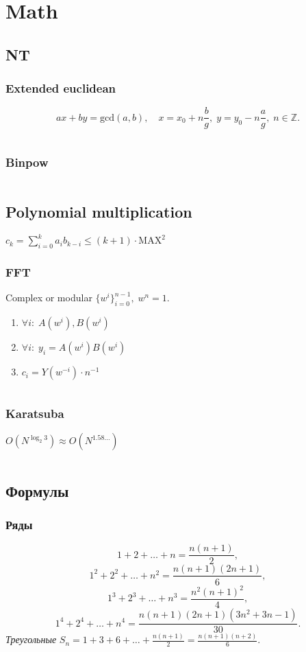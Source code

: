 \section{Math}

\subsection{NT}
\subsubsection{Extended euclidean}
$$ax+by=\text{gcd}(a,b),\quad x=x_0+n\dfrac{b}{g},\;y=y_0-n\dfrac{a}{g},\;n\in\mathbb{Z}.$$
\inputminted{cpp}{../code/math/egcd.cpp}
\subsubsection{Binpow}
\inputminted{cpp}{../code/math/binpow.cpp}

\subsection{Polynomial multiplication}
$c_k=\displaystyle\sum_{i=0}^ka_ib_{k-i}\le(k+1)\cdot\text{MAX}^2$

\subsubsection{FFT}
Complex or modular $\{w^i\}_{i=0}^{n-1},\;w^n=1$.
\begin{enumerate}
\item $\forall i:\;A(w^i),B(w^i)$
\item $\forall i:\;y_i=A(w^i)B(w^i)$
\item $c_i=Y(w^{-i})\cdot n^{-1}$
\end{enumerate}
\inputminted{cpp}{../code/math/fft.cpp}
\subsubsection{Karatsuba}
$O(N^{\log_2 3})\approx O(N^{1.58\dots})$
\inputminted{cpp}{../code/math/karatsuba.cpp}

\subsection{Формулы}
\subsubsection{Ряды}
$$1+2+\dots+n=\frac{n(n+1)}{2},$$
$$1^2+2^2+\dots+n^2=\frac{n(n+1)(2n+1)}{6},$$
$$1^3+2^3+\dots+n^3=\frac{n^2(n+1)^2}{4},$$
$$1^4+2^4+\dots+n^4=\frac{n(n+1)(2n+1)(3n^2+3n-1)}{30}.$$
\textit{Треугольные} $S_n=1+3+6+\dots+\frac{n(n+1)}{2}=\frac{n(n+1)(n+2)}{6}.$
